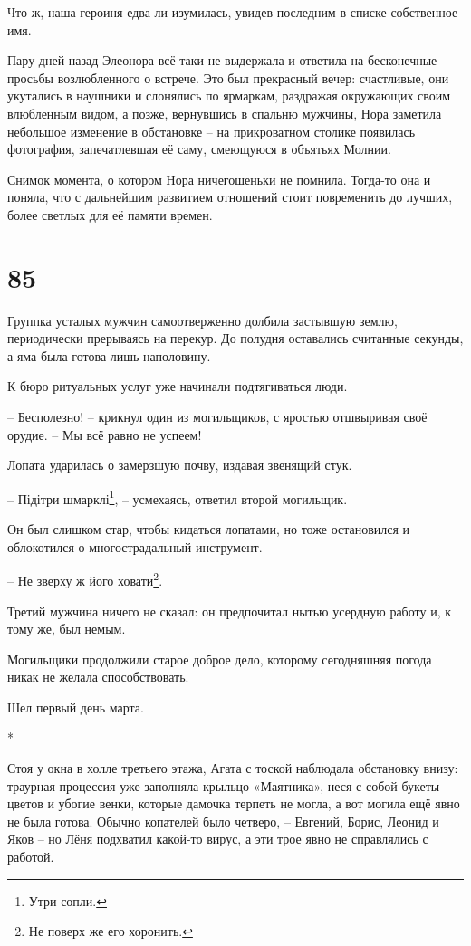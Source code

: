 \documentclass[
  a5paperpaper,
  DIV=11,
  numbers=noendperiod]{scrreprt}
\begin{document}
Что ж, наша героиня едва ли изумилась, увидев последним в списке
собственное имя.

Пару дней назад Элеонора всё-таки не выдержала и ответила на бесконечные
просьбы возлюбленного о встрече. Это был прекрасный вечер: счастливые,
они укутались в наушники и слонялись по ярмаркам, раздражая окружающих
своим влюбленным видом, а позже, вернувшись в спальню мужчины, Нора
заметила небольшое изменение в обстановке -- на прикроватном столике
появилась фотография, запечатлевшая её саму, смеющуюся в объятьях
Молнии.

Снимок момента, о котором Нора ничегошеньки не помнила. Тогда-то она и
поняла, что с дальнейшим развитием отношений стоит повременить до
лучших, более светлых для её памяти времен.

\section*{85}\label{85}


Группка усталых мужчин самоотверженно долбила застывшую землю,
периодически прерываясь на перекур. До полудня оставались считанные
секунды, а яма была готова лишь наполовину.

К бюро ритуальных услуг уже начинали подтягиваться люди.

-- Бесполезно! -- крикнул один из могильщиков, с яростью отшвыривая своё
орудие. -- Мы всё равно не успеем!

Лопата ударилась о замерзшую почву, издавая звенящий стук.

-- Підітри шмарклі\footnote{Утри сопли.}, -- усмехаясь, ответил второй
могильщик.

Он был слишком стар, чтобы кидаться лопатами, но тоже остановился и
облокотился о многострадальный инструмент.

-- Не зверху ж його ховати\footnote{Не поверх же его хоронить.}.

Третий мужчина ничего не сказал: он предпочитал нытью усердную работу и,
к тому же, был немым.

Могильщики продолжили старое доброе дело, которому сегодняшняя погода
никак не желала способствовать.

Шел первый день марта.

*

Стоя у окна в холле третьего этажа, Агата с тоской наблюдала обстановку
внизу: траурная процессия уже заполняла крыльцо «Маятника», неся с собой
букеты цветов и убогие венки, которые дамочка терпеть не могла, а вот
могила ещё явно не была готова. Обычно копателей было четверо, --
Евгений, Борис, Леонид и Яков -- но Лёня подхватил какой-то вирус, а эти
трое явно не справлялись с работой.
\end{document}
